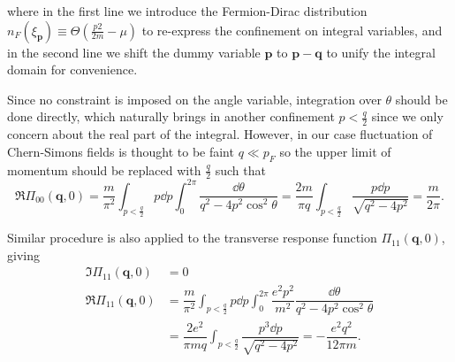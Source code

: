 \documentclass[bachelor,english,numbers]{ustcthesis}
\begin{document}
		where in the first line we introduce the Fermion-Dirac distribution $n_F(\xi_{\bm{p}})\equiv\varTheta(\frac{p2}{2m}-\mu)$ to re-express the confinement on integral variables, and in the second line we shift the dummy variable $\bm{p}$ to $\bm{p-q}$ to unify the integral domain for convenience.\par
		Since no constraint is imposed on the angle variable, integration over $\theta$ should be done directly, which naturally brings in another confinement $p<\frac q 2$ since we only concern about the real part of the integral. However, in our case fluctuation of Chern-Simons fields is thought to be faint $q\ll p_F$ so the upper limit of momentum should be replaced with $\frac q 2$ such that
		\begin{equation}\label{3.2.3}
			\Re \Pi_{00}(\bm{q},0)=\dfrac{m}{\pi^2}\int_{p<\frac q 2}p\dd p\int_0^{2\pi}\dfrac{\dd\theta}{q^2-4p^2\cos^2\theta}=\dfrac{2m}{\pi q}\int_{p<\frac q 2}\dfrac{p\dd p}{\sqrt{q^2-4p^2}}=\dfrac{m}{2\pi}.
		\end{equation}

		Similar procedure is also applied to the transverse response function $\Pi_{11}(\bm{q},0)$, giving
		\begin{align}\label{3.2.4}
			\Im \Pi_{11}(\bm{q},0)&=0\nonumber\\
			\Re \Pi_{11}(\bm{q},0)&=\dfrac{m}{\pi^2}\int_{p<\frac q 2}p\dd p\int_0^{2\pi}\dfrac{e^2p^2}{m^2}\dfrac{\dd\theta}{q^2-4p^2\cos^2\theta}\nonumber\\
			&=\dfrac{2e^2}{\pi mq}\int_{p<\frac q 2}\dfrac{p^3\dd p}{\sqrt{q^2-4p^2}}=-\dfrac{e^2 q^2}{12\pi m}.
		\end{align}
\end{document}
